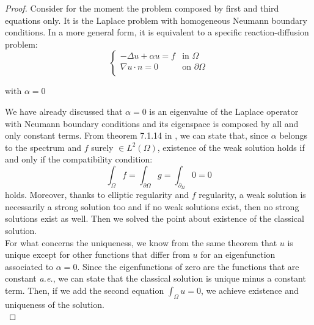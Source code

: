 \documentclass[a4paper,11pt]{article}
\begin{document}
\begin{proof}
	Consider for the moment the problem composed by first and third equations only. It is the Laplace problem with homogeneous Neumann boundary conditions. In a more general form, it is equivalent to a specific reaction-diffusion problem:
	\begin{equation*}
	\begin{cases}
	-\Delta{u} + \alpha u =f & \text{in } \Omega\\
	\nabla u \cdot n = 0 & \text{on } \partial \Omega \\
	\end{cases}
	\end{equation*}
	\begin{center}
		with $\alpha = 0$
	\end{center}
     We have already discussed that $\alpha=0$ is an eigenvalue of the Laplace operator with Neumann boundary conditions and its eigenspace is composed by all and only constant terms. From theorem 7.1.14 in \cite{gazzola}, we can state that, since $\alpha$ belongs to the spectrum and $f$ surely $\in L^2(\Omega)$, existence of the weak solution holds if and only if the compatibility condition:
     \begin{equation*}
     \int_{\Omega}f = \int_{\partial \Omega} g = \int_{\partial_\Omega} 0 = 0 
     \end{equation*}
     holds. Moreover, thanks to elliptic regularity and $f$ regularity, a weak solution is necessarily a strong solution too and if no weak solutions exist, then no strong solutions exist as well. Then we solved the point about existence of the classical solution. \\
     
     \noindent For what concerns the uniqueness, we know from the same theorem that $u$ is unique except for other functions that differ from $u$ for an eigenfunction associated to $\alpha=0$. Since the eigenfunctions of zero are the functions that are constant \emph{a.e.}, we can state that the classical solution is unique minus a constant term. Then, if we add the second equation $\int_{\Omega}u = 0$, we achieve existence and uniqueness of the solution. \\
     

\end{proof}
\end{document}
